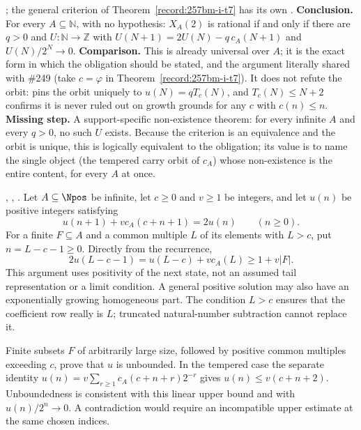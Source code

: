 \begin{obs}
;
the general criterion of Theorem~\ref{record:257bm-i-t7} has its own
.
\textbf{Conclusion.} For every $A\subseteq\mathbb N$, with no hypothesis:
$X_{A}(2)$ is rational if and only if there are $q>0$ and $U:\mathbb N\to\mathbb Z$ with
$U(N+1)=2U(N)-q\,c_A(N+1)$ and $U(N)/2^N\to0$.
\textbf{Comparison.} This is already universal over $A$; it is the exact form in which the
obligation should be stated, and the argument literally shared with \#249 (take
$c=\varphi$ in Theorem~\ref{record:257bm-i-t7}). It does not refute the orbit:
 pins the orbit
uniquely to $u(N)=qT_c(N)$, and $T_c(N)\le N{+}2$ confirms it is never ruled out on growth
grounds for any $c$ with $c(n)\le n$.
\textbf{Missing step.} A support-specific non-existence theorem: for every infinite $A$ and
every $q>0$, no such $U$ exists.  Because the criterion is an equivalence and the orbit is
unique, this is logically equivalent to the obligation; its value is to name the single object
(the tempered carry orbit of $c_{A}$) whose non-existence is the entire content, for every $A$
at once.
\end{obs}

\begin{obs}
,
,
.
Let $A\subseteq\Npos$ be infinite, let $c\ge0$ and $v\ge1$ be integers,
and let $u(n)$ be positive integers satisfying
\[
 u(n+1)+v c_A(c+n+1)=2u(n)\qquad(n\ge0).
\]
For a finite $F\subseteq A$ and a common multiple $L$ of its
elements with \emph{$L>c$}, put $n=L-c-1\ge0$.  Directly from
the recurrence,
\[
 2u(L-c-1)=u(L-c)+v c_A(L)\ge1+v|F|.
\]
This argument uses positivity of the next state, not an assumed
tail representation or a limit condition.  A general positive
solution may also have an exponentially growing homogeneous part.
The condition $L>c$ ensures that the coefficient row really is
$L$; truncated natural-number subtraction cannot replace it.

Finite subsets $F$ of arbitrarily large size, followed by positive
common multiples exceeding $c$, prove that $u$ is unbounded.
In the tempered case the separate identity
$u(n)=v\sum_{r\ge1}c_A(c+n+r)2^{-r}$ gives
$u(n)\le v(c+n+2)$.  Unboundedness is consistent with this linear
upper bound and with $u(n)/2^n\to0$.  A contradiction would require
an incompatible upper estimate at the same chosen indices.
\end{obs}

